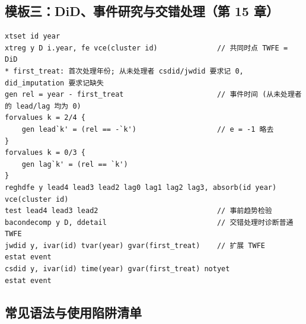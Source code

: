 \subsection{模板三：DiD、事件研究与交错处理（第 15 章）}

\begin{lstlisting}
xtset id year
xtreg y D i.year, fe vce(cluster id)              // 共同时点 TWFE = DiD
* first_treat: 首次处理年份; 从未处理者 csdid/jwdid 要求记 0, did_imputation 要求记缺失
gen rel = year - first_treat                      // 事件时间 (从未处理者的 lead/lag 均为 0)
forvalues k = 2/4 {
    gen lead`k' = (rel == -`k')                   // e = -1 略去
}
forvalues k = 0/3 {
    gen lag`k' = (rel == `k')
}
reghdfe y lead4 lead3 lead2 lag0 lag1 lag2 lag3, absorb(id year) vce(cluster id)
test lead4 lead3 lead2                            // 事前趋势检验
bacondecomp y D, ddetail                          // 交错处理时诊断普通 TWFE
jwdid y, ivar(id) tvar(year) gvar(first_treat)    // 扩展 TWFE
estat event
csdid y, ivar(id) time(year) gvar(first_treat) notyet
estat event
\end{lstlisting}

\subsection{常见语法与使用陷阱清单}

